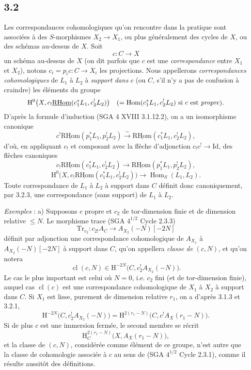 \documentclass[11pt]{article}
\renewcommand{\H}{\mathrm{H}}
\DeclareMathOperator{\Hom}{Hom}
\newcommand{\R}{\mathrm{R}}\newcommand{\RHomCore}{\mathrm{RHom}}
\providecommand{\RHom}{\RHomCore}
\providecommand{\uRHom}{\underline{\RHom}}
\providecommand{\Id}{\mathrm{Id}}
\providecommand{\RHom}{\RHomCore}
\providecommand{\Hom}{\operatorname{Hom}}
\providecommand{\RHom}{\R\mathcal{H}om}
\providecommand{\R}{\mathrm R}
\providecommand{\RHom}{\RHomCore}
\providecommand{\Hom}{\operatorname{Hom}}
\begin{document}
\subsection*{3.2}
Les correspondances cohomologiques qu'on rencontre dans la pratique sont associées à des $S$-morphismes $X_2\to X_1$, ou plus généralement des cycles de $X$, ou des schémas au-dessus de $X$. Soit
\[
c:C\longrightarrow X
\]
un schéma au-dessus de $X$ (on dit parfois que $c$ est une \emph{correspondance} entre $X_1$ et $X_2$), notons $c_i=p_ic:C\to X_i$ les projections. Nous appellerons \emph{correspondances cohomologiques} de $L_1$ à $L_2$ à \emph{support dans} $c$ (ou $C$, s'il n'y a pas de confusion à craindre) les éléments du groupe
\[
\H^0\bigl(X,c_!\uRHom(c_1^*L_1,c_2^!L_2)\bigr)
\quad(=\Hom(c_1^*L_1,c_2^!L_2)\text{ si }c\text{ est \emph{propre}}).
\]
D'après la formule d'induction (SGA 4 XVIII 3.1.12.2), on a un isomorphisme canonique
\begin{equation}
c^!\uRHom(p_1^*L_1,p_2^!L_2)
\xrightarrow{\sim}
\uRHom(c_1^*L_1,c_2^!L_2),
\tag{3.2.1}
\end{equation}
d'où, en appliquant $c_!$ et composant avec la flèche d'adjonction $c_!c^!\to \Id$, des flèches canoniques
\begin{equation}
c_!\uRHom(c_1^*L_1,c_2^!L_2)
\longrightarrow
\uRHom(p_1^*L_1,p_2^!L_2),
\tag{3.2.2}
\end{equation}
\begin{equation}
\H^0\bigl(X,c_!\uRHom(c_1^*L_1,c_2^!L_2)\bigr)
\longrightarrow
\Hom_S(L_1,L_2).
\tag{3.2.3}
\end{equation}
Toute correspondance de $L_1$ à $L_2$ à support dans $C$ définit donc canoniquement, par 3.2.3, une correspondance (sans support) de $L_1$ à $L_2$.

\emph{Exemples} : a) Supposons $c$ propre et $c_2$ de tor-dimension finie et de dimension relative $\leq N$. Le morphisme trace (SGA $4^{1/2}$ Cycle 2.3.3)
\[
\mathrm{Tr}_{c_2}:c_{2!}A_C\longrightarrow A_{X_2}(-N)[-2N]
\]
définit par adjonction une correspondance cohomologique de $A_{X_1}$ à $A_{X_2}(-N)[-2N]$ 
à
support dans $C$, qu'on appellera \emph{classe de} $(c,N)$, et qu'on notera
\begin{equation}
\operatorname{cl}(c,N)\in \H^{-2N}\bigl(C,c_2^!A_{X_2}(-N)\bigr).
\tag{3.2.4}
\end{equation}
Le cas le plus important est celui où $N=0$, i.e. $c_2$ fini (et de tor-dimension finie), auquel cas $\operatorname{cl}(c)$ est une correspondance cohomologique de $X_1$ à $X_2$ à support dans $C$. Si $X_1$ est lisse, purement de dimension relative $r_1$, on a d'après 3.1.3 et 3.2.1,
\begin{equation}
\H^{-2N}\bigl(C,c_2^!A_{X_2}(-N)\bigr)
=
\H^{2(r_1-N)}\bigl(C,c^!A_X(r_1-N)\bigr).
\tag{3.2.5}
\end{equation}
Si de plus $c$ est une immersion fermée, le second membre se récrit
\[
\H^{2(r_1-N)}_C\bigl(X,A_X(r_1-N)\bigr),
\]
et la classe de $(c,N)$, considérée comme élément de ce groupe, n'est autre que la classe de cohomologie associée à $c$ au sens de (SGA $4^{1/2}$ Cycle 2.3.1), comme il résulte aussitôt des définitions.
\end{document}
